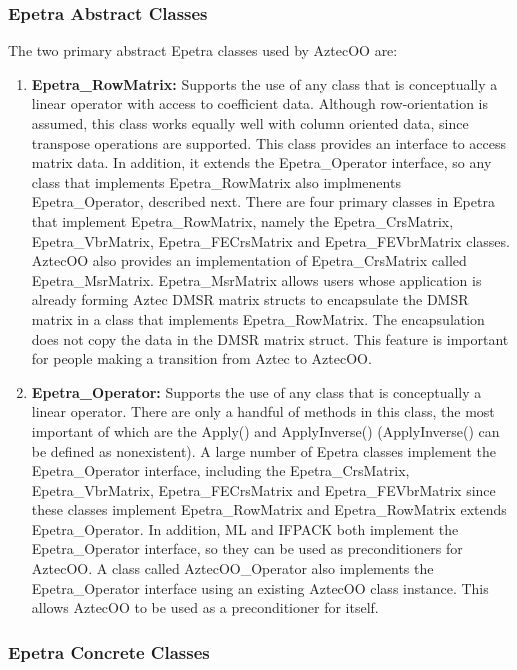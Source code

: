 \documentclass[12pt,relax]{AztecOOUserGuide}
\newcommand{\crsmatrix}{Epetra\_CrsMatrix}
\newcommand{\vbrmatrix}{Epetra\_VbrMatrix}
\newcommand{\rowmatrix}{Epetra\_RowMatrix}
\newcommand{\operator}{Epetra\_Operator}
\newcommand{\fecrsmatrix}{Epetra\_FECrsMatrix}
\newcommand{\fevbrmatrix}{Epetra\_FEVbrMatrix}
\newcommand{\msrmatrix}{Epetra\_MsrMatrix}
\newcommand{\oooperator}{AztecOO\_Operator}
\begin{document}
\subsubsection{Epetra Abstract Classes}

The two primary abstract Epetra classes used by AztecOO are:
\begin{enumerate}
\item {\bf \rowmatrix{}: } Supports the use of any class that is
conceptually a linear operator with access to coefficient data.
Although row-orientation is assumed, this class works equally well
with column oriented data, since transpose operations are supported.  
This class provides an interface to access matrix data.  In addition,
it extends the \operator{} interface, so any class that implements
\rowmatrix{} also implmenents \operator{}, described next.  There are
four primary classes in Epetra that implement \rowmatrix{}, namely 
the \crsmatrix{}, \vbrmatrix{}, \fecrsmatrix{} and \fevbrmatrix{}
classes.  AztecOO also provides an implementation of \crsmatrix{}
called \msrmatrix{}.  \msrmatrix{} allows users whose application is
already forming Aztec DMSR matrix structs to encapsulate the DMSR
matrix in a class that implements \rowmatrix.  The encapsulation does
not copy the data in the DMSR matrix struct.  This feature is
important for people making a transition from Aztec to AztecOO.
\item {\bf \operator{}: } Supports the use of any class that is
conceptually a linear operator.  There are only a handful of methods
in this class, the most important of which are the Apply() and
ApplyInverse() (ApplyInverse() can be defined as nonexistent).  
A large number of Epetra classes implement the
\operator{} interface, including the \crsmatrix{}, \vbrmatrix{},
\fecrsmatrix{} and \fevbrmatrix{} since these classes implement
\rowmatrix{} and \rowmatrix{} extends \operator{}.  In addition, ML
and IFPACK both implement the \operator{} interface, so they can be
used as preconditioners for AztecOO.  A class called \oooperator{}
also implements the \operator{} interface using an existing AztecOO
class instance.  This allows AztecOO to be used as a preconditioner
for itself.

\end{enumerate}

\subsubsection{Epetra Concrete Classes}
\end{document}
